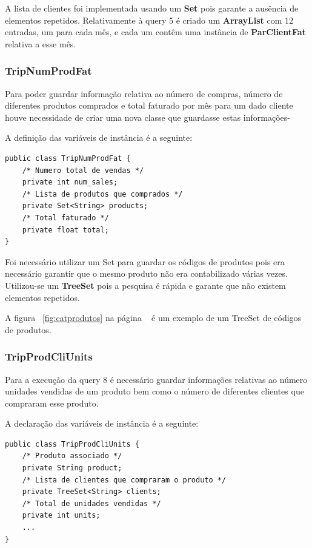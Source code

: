 \documentclass[10pt] {article}
\begin{document}
A lista de clientes foi implementada usando um \color{blue} \textbf{Set} \color{black} pois garante a ausência de elementos 
repetidos.
Relativamente à query 5 é criado um \color{blue} \textbf{ArrayList} \color{black} com 12 entradas, um para cada mês, e cada 
um contêm uma instância de \color{blue} \textbf{ParClientFat} \color{black} relativa a esse mês.

\subsubsection{TripNumProdFat}

Para poder guardar informação relativa ao número de compras, número de diferentes produtos comprados e total faturado por mês para um dado cliente houve necessidade de criar uma nova classe que guardasse estas informações-

A definição das variáveis de instância é a seguinte:

\begin{lstlisting}
public class TripNumProdFat {
	/* Numero total de vendas */
	private int num_sales;
	/* Lista de produtos que comprados */
	private Set<String> products;
	/* Total faturado */
	private float total;
}
\end{lstlisting}


Foi necessário utilizar um Set para guardar os códigos de produtos pois era necessário garantir que o mesmo produto não era 
contabilizado várias vezes.
Utilizou-se um \color{blue} \textbf{TreeSet} \color{black} pois a pesquisa é rápida e garante que não existem elementos 
repetidos.

A figura ~\ref{fig:catprodutos} na página ~\pageref{fig:catprodutos} é um exemplo de um TreeSet de códigos de produtos.

\subsubsection{TripProdCliUnits}

Para a execução da query 8 é necessário guardar informações relativas ao número unidades vendidas de um produto
bem como o número de diferentes clientes que compraram esse produto.

A declaração das variáveis de instância é a seguinte:

\begin{lstlisting}
public class TripProdCliUnits {
	/* Produto associado */
	private String product;
	/* Lista de clientes que compraram o produto */
	private TreeSet<String> clients;
	/* Total de unidades vendidas */
	private int units;
	...
}
\end{lstlisting}
\end{document}
